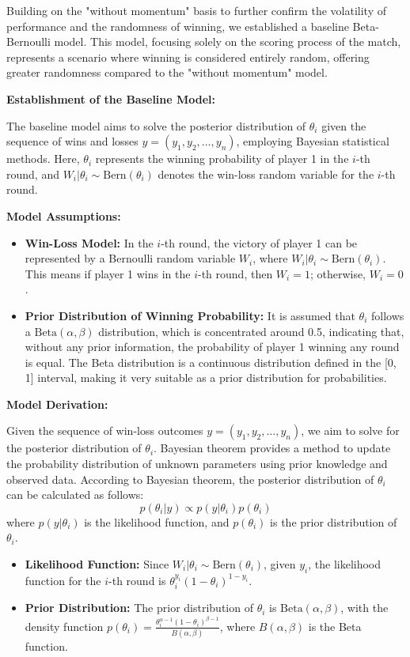 \documentclass{mcmthesis}
\begin{document}
Building on the "without momentum" basis to further confirm the volatility of performance and the randomness of winning, we established a baseline Beta-Bernoulli model. This model, focusing solely on the scoring process of the match, represents a scenario where winning is considered entirely random, offering greater randomness compared to the "without momentum" model.

\textbf{Establishment of the Baseline Model:}

The baseline model aims to solve the posterior distribution of $\theta_i$ given the sequence of wins and losses $y = (y_1, y_2, \ldots, y_n)$, employing Bayesian statistical methods. Here, $\theta_i$ represents the winning probability of player 1 in the $i$-th round, and $W_i | \theta_i \sim \text{Bern}(\theta_i)$ denotes the win-loss random variable for the $i$-th round.

\textbf{Model Assumptions:}

\begin{itemize}
  \item \textbf{Win-Loss Model:} In the $i$-th round, the victory of player 1 can be represented by a Bernoulli random variable $W_i$, where $W_i | \theta_i \sim \text{Bern}(\theta_i)$. This means if player 1 wins in the $i$-th round, then $W_i = 1$; otherwise, $W_i = 0$.
  \item \textbf{Prior Distribution of Winning Probability:} It is assumed that $\theta_i$ follows a $\text{Beta}(\alpha, \beta)$ distribution, which is concentrated around 0.5, indicating that, without any prior information, the probability of player 1 winning any round is equal. The Beta distribution is a continuous distribution defined in the [0, 1] interval, making it very suitable as a prior distribution for probabilities.
\end{itemize}

\textbf{Model Derivation:}


Given the sequence of win-loss outcomes $y = (y_1, y_2, \ldots, y_n)$, we aim to solve for the posterior distribution of $\theta_i$. Bayesian theorem provides a method to update the probability distribution of unknown parameters using prior knowledge and observed data. According to Bayesian theorem, the posterior distribution of $\theta_i$ can be calculated as follows:
$$
p(\theta_i | y) \propto p(y | \theta_i) p(\theta_i)
$$
where $p(y | \theta_i)$ is the likelihood function, and $p(\theta_i)$ is the prior distribution of $\theta_i$.

\begin{itemize}
\item \textbf{Likelihood Function:} Since $W_i | \theta_i \sim \text{Bern}(\theta_i)$, given $y_i$, the likelihood function for the $i$-th round is $\theta_i^{y_i} (1 - \theta_i)^{1 - y_i}$.
\item \textbf{Prior Distribution:} The prior distribution of $\theta_i$ is $\text{Beta}(\alpha, \beta)$, with the density function $p(\theta_i) = \frac{\theta_i^{\alpha-1} (1 - \theta_i)^{\beta-1}}{B(\alpha, \beta)}$, where $B(\alpha, \beta)$ is the Beta function.
\end{itemize}
\end{document}
